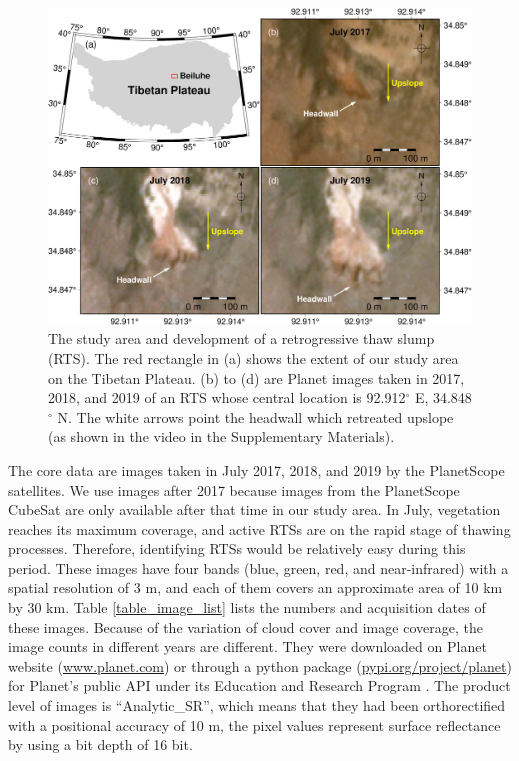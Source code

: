 \documentclass[authoryear,preprint,review,12pt]{elsarticle}
\begin{document}
\begin{figure} 
	\centering
	\includegraphics[width=14cm]{figs/rts_multi_images_study_area_v3.jpg}
	\caption{The study area and development of a retrogressive thaw slump (RTS). The red 
	rectangle in (a) shows the extent of our study area
	on the Tibetan Plateau. (b) to (d) are Planet images taken in 2017, 2018, and 2019 of an RTS whose central location is 92.912$^\circ$ E, 34.848$^\circ$ N. The white arrows point the headwall which retreated upslope (as shown in the video in the Supplementary Materials).} %
	\label{fig_multi_rts_image_studyarea}
\end{figure}


The core data are images taken in July 2017, 2018, and 2019 by the PlanetScope satellites.
We use images after 2017 because images from the PlanetScope CubeSat are only available after that time in our study area.  
In July, vegetation reaches its maximum coverage, and active RTSs are on the rapid stage of thawing processes. 
Therefore, identifying RTSs would be relatively easy during this period.
These images have four bands (blue, green, red, and near-infrared) with a spatial resolution of 3 m, and each of them covers an approximate area of 10 km by 30 km.
Table \ref{table_image_list} lists the numbers and acquisition dates of these images. 
Because of the variation of cloud cover and image coverage, the image counts in different years are different.
They were downloaded on Planet website (\url{www.planet.com}) or through a python package (\url{pypi.org/project/planet}) for Planet's public API under its Education and Research Program \citep{team2018planet}. 
The product level of images is ``Analytic\_SR'', which means that they had been orthorectified with a positional accuracy of 10 m, the pixel values represent surface reflectance by using a bit depth of 16 bit. 
\end{document}

